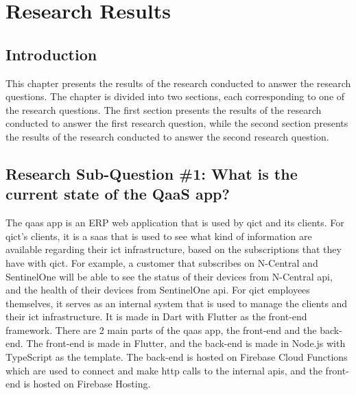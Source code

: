 \chapter{Research Results}
\begin{multicols}{2}
      \section{Introduction}
      This chapter presents the results of the research conducted to answer the research questions. The chapter is
      divided into two sections, each corresponding to one of the research questions. The first section presents
      the results of the research conducted to answer the first research question, while the second section
      presents the results of the research conducted to answer the second research question.

      \section{Research Sub-Question \#1: What is the current state of the QaaS app?}

      The \acrshort{qaas} app is an \gls{ERP} web application that is used by \acrshort{qict} and its clients.
      For \acrshort{qict}'s clients, it is a \acrshort{saas} that is used to see what kind of information are available
      regarding their \acrshort{ict} infrastructure, based on the subscriptions that they have with \acrshort{qict}.
      For example, a customer that subscribes on N-Central and SentinelOne will be able to see the status of their
      devices from N-Central \acrshort{api}, and the health of their devices from SentinelOne \acrshort{api}.
      For \acrshort{qict} employees themselves, it serves as an internal system that is used to manage the clients and their
      \acrshort{ict} infrastructure. It is made in Dart with Flutter as the front-end framework. There are 2 main parts of the
      \acrshort{qaas} app, the front-end and the back-end. The front-end is made in Flutter, and the back-end is made in Node.js with
      TypeScript as the template. The back-end is hosted on Firebase Cloud Functions which are used to connect and make \acrshort{http}
      calls to the internal \acrshort{api}s, and the front-end is hosted on Firebase Hosting.


\end{multicols}
